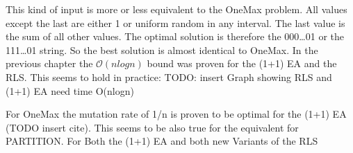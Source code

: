 This kind of input is more or less equivalent to the OneMax problem. All values except the last are either 1 or uniform
random in any interval. The last value is the sum of all other values. The optimal solution is therefore the 000\dots01 or
the 111\dots01 string. So the best solution is almost identical to OneMax. In the previous chapter the $\mathcal{O}(nlogn)$ bound was
proven for the (1+1) EA and the RLS. This seems to hold in practice:
TODO: insert Graph showing RLS and (1+1) EA need time O(nlogn)

For OneMax the mutation rate of 1/n is proven to be optimal for the (1+1) EA (TODO insert cite). This seems to be also
true for the equivalent for PARTITION. For Both the (1+1) EA and both new Variants of the RLS
